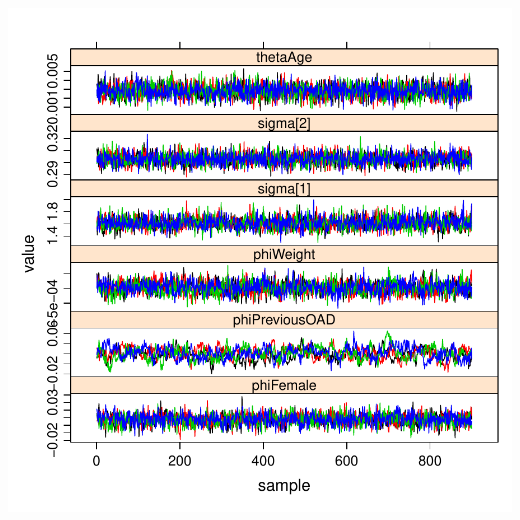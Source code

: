 \documentclass{beamer}
\begin{document}
\begin{frame}
\begin{columns}
\includegraphics[width=\textwidth,height=0.4\textheight]{graphics/goodConvergence.pdf}
\end{columns}

\end{frame}
\end{document}
